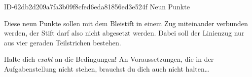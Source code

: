 \begin{exercise}
      {ID-62db2d209a7fa3b09f8cfed6eda81856ed3e524f}
      {Neun Punkte}
  \ifproblem\problem\par
    Diese neun Punkte sollen mit dem Bleistift in einem Zug miteinander
    verbunden werden, der Stift darf also nicht abgesetzt werden.
    Dabei soll der Linienzug nur aus vier geraden Teilstrichen bestehen.
    \begin{center}
    \end{center}
  \fi
  \ifoutline\outline\par
    Halte dich \emph{exakt} an die Bedingungen! An Voraussetzungen, die
    in der Aufgabenstellung nicht stehen, brauchst du dich auch
    nicht halten\ldots
  \fi
\end{exercise}
